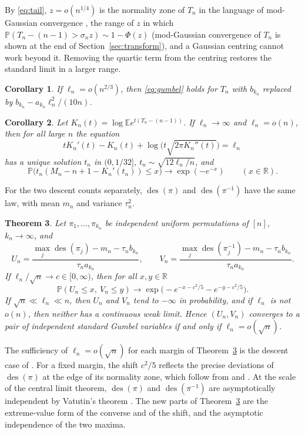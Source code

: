 \documentclass[11pt]{amsart}
\newtheorem{theorem}{Theorem}
\newtheorem{corollary}[theorem]{Corollary}
\theoremstyle{remark}
\newcommand{\des}{\operatorname{des}}
\newcommand{\E}{\mathbb{E}}
\renewcommand{\P}{\mathbb{P}}
\newcommand{\R}{\mathbb{R}}
\begin{document}
By \eqref{eq:tail}, $z=o(n^{1/4})$ is the normality zone of $T_n$ in the language of mod-Gaussian convergence \cite[Proposition~4.14]{FMN16}, the range of $z$ in which $\P(T_n-(n-1)>\sigma_nz)\sim1-\Phi(z)$ (mod-Gaussian convergence of $T_n$ is shown at the end of Section~\ref{sec:transform}), and a Gaussian centring cannot work beyond it.
Removing the quartic term from the centring restores the standard limit in a larger range.

\begin{corollary}\label{cor:centring}
If $\ell_n=o(n^{2/3})$, then \eqref{eq:gumbel} holds for $T_n$ with $b_{k_n}$ replaced by $b_{k_n}-a_{k_n}\ell_n^2/(10n)$.
\end{corollary}

\begin{corollary}\label{cor:implicit}
Let $K_n(t)=\log\E e^{t(T_n-(n-1))}$. If $\ell_n\to\infty$ and $\ell_n=o(n)$, then for all large $n$ the equation
\[
tK_n'(t)-K_n(t)+\log\bigl(t\sqrt{2\pi K_n''(t)}\bigr)=\ell_n
\]
has a unique solution $t_n$ in $(0,1/32]$, $t_n\sim\sqrt{12\ell_n/n}$, and
\[
\P\bigl(t_n(M_n-n+1-K_n'(t_n))\le x\bigr)\to\exp(-e^{-x})\qquad(x\in\R).
\]
\end{corollary}

For the two descent counts separately, $\des(\pi)$ and $\des(\pi^{-1})$ have the same law, with mean $m_n$ and variance $\tau_n^2$.

\begin{theorem}\label{thm:joint}
Let $\pi_1,\dots,\pi_{k_n}$ be independent uniform permutations of $[n]$, $k_n\to\infty$, and
\[
U_n=\frac{\max_j\des(\pi_j)-m_n-\tau_nb_{k_n}}{\tau_na_{k_n}},\qquad V_n=\frac{\max_j\des(\pi_j^{-1})-m_n-\tau_nb_{k_n}}{\tau_na_{k_n}}.
\]
If $\ell_n/\sqrt n\to c\in[0,\infty)$, then for all $x,y\in\R$
\[
\P(U_n\le x,\ V_n\le y)\to\exp\bigl(-e^{-x-c^2/5}-e^{-y-c^2/5}\bigr).
\]
If $\sqrt n\ll\ell_n\ll n$, then $U_n$ and $V_n$ tend to $-\infty$ in probability, and if $\ell_n$ is not $o(n)$, then neither has a continuous weak limit. Hence $(U_n,V_n)$ converges to a pair of independent standard Gumbel variables if and only if $\ell_n=o(\sqrt n)$.
\end{theorem}

The sufficiency of $\ell_n=o(\sqrt n)$ for each margin of Theorem~\ref{thm:joint} is the descent case of \cite[Theorem~13(b)]{DK24}. For a fixed margin, the shift $c^2/5$ reflects the precise deviations of $\des(\pi)$ at the edge of its normality zone, which follow from \cite[Proposition~4.1]{HST24} and \cite[Theorems~4.3 and~4.8]{FMN16}. At the scale of the central limit theorem, $\des(\pi)$ and $\des(\pi^{-1})$ are asymptotically independent by Vatutin's theorem \cite{Vat96}. The new parts of Theorem~\ref{thm:joint} are the extreme-value form of the converse and of the shift, and the asymptotic independence of the two maxima.
\end{document}
